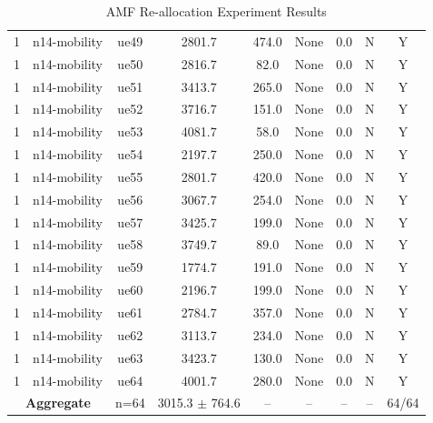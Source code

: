 \begin{table}[ht]
\begin{tabular}{|c|c|c|c|c|c|c|c|c|}
1 & n14-mobility & ue49 & 2801.7 & 474.0 & None & 0.0 & N & Y \\
1 & n14-mobility & ue50 & 2816.7 & 82.0 & None & 0.0 & N & Y \\
1 & n14-mobility & ue51 & 3413.7 & 265.0 & None & 0.0 & N & Y \\
1 & n14-mobility & ue52 & 3716.7 & 151.0 & None & 0.0 & N & Y \\
1 & n14-mobility & ue53 & 4081.7 & 58.0 & None & 0.0 & N & Y \\
1 & n14-mobility & ue54 & 2197.7 & 250.0 & None & 0.0 & N & Y \\
1 & n14-mobility & ue55 & 2801.7 & 420.0 & None & 0.0 & N & Y \\
1 & n14-mobility & ue56 & 3067.7 & 254.0 & None & 0.0 & N & Y \\
1 & n14-mobility & ue57 & 3425.7 & 199.0 & None & 0.0 & N & Y \\
1 & n14-mobility & ue58 & 3749.7 & 89.0 & None & 0.0 & N & Y \\
1 & n14-mobility & ue59 & 1774.7 & 191.0 & None & 0.0 & N & Y \\
1 & n14-mobility & ue60 & 2196.7 & 199.0 & None & 0.0 & N & Y \\
1 & n14-mobility & ue61 & 2784.7 & 357.0 & None & 0.0 & N & Y \\
1 & n14-mobility & ue62 & 3113.7 & 234.0 & None & 0.0 & N & Y \\
1 & n14-mobility & ue63 & 3423.7 & 130.0 & None & 0.0 & N & Y \\
1 & n14-mobility & ue64 & 4001.7 & 280.0 & None & 0.0 & N & Y \\
\multicolumn{2}{|c|}{\textbf{Aggregate}} & n=64 & 3015.3 $\pm$ 764.6 & -- & -- & -- & -- & 64/64 \\
\hline
\end{tabular}
\caption{AMF Re-allocation Experiment Results}
\label{tab:amf_realloc}
\end{table}
